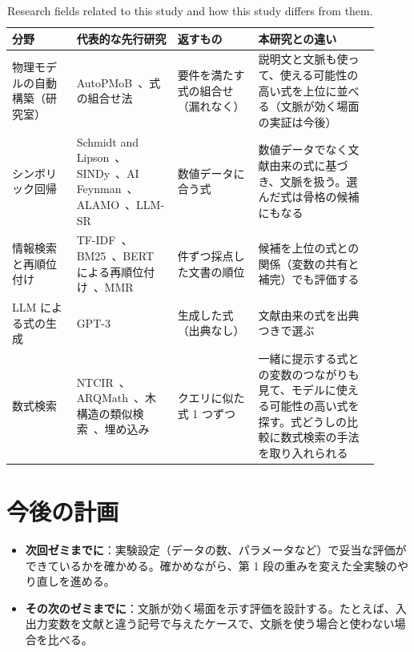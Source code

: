 \documentclass[a4j,dvipdfmx,10pt]{jresume}
\begin{document}
\begin{table}[t]\centering
\footnotesize
\caption{Research fields related to this study and how this study differs from them.}
\label{tab:summary}
\begin{tabular}{@{}>{\raggedright\arraybackslash}p{0.16\linewidth}>{\raggedright\arraybackslash}p{0.25\linewidth}>{\raggedright\arraybackslash}p{0.20\linewidth}>{\raggedright\arraybackslash}p{0.30\linewidth}@{}}
\toprule
分野 & 代表的な先行研究 & 返すもの & 本研究との違い \\
\midrule
物理モデルの自動構築（研究室） & AutoPMoB~\citep{KatoCSTR,KatoProto}、式の組合せ法~\citep{KatoESCAPE,CombineEq} & 要件を満たす式の組合せ（漏れなく） & 説明文と文脈も使って、使える可能性の高い式を上位に並べる（文脈が効く場面の実証は今後） \\
\addlinespace
シンボリック回帰 & Schmidt and Lipson~\citep{SchmidtLipson}、SINDy~\citep{SINDy}、AI Feynman~\citep{AIFeynman}、ALAMO~\citep{ALAMO}、LLM-SR~\citep{LLMSR} & 数値データに合う式 & 数値データでなく文献由来の式に基づき、文脈を扱う。選んだ式は骨格の候補にもなる \\
\addlinespace
情報検索と再順位付け & TF-IDF~\citep{Salton}、BM25~\citep{BM25}、BERT による再順位付け~\citep{BERTrerank}、MMR~\citep{MMR} & 1 件ずつ採点した文書の順位 & 候補を上位の式との関係（変数の共有と補完）でも評価する \\
\addlinespace
LLM による式の生成 & GPT-3~\citep{GPT3} & 生成した式（出典なし） & 文献由来の式を出典つきで選ぶ \\
\addlinespace
数式検索 & NTCIR~\citep{NTCIR12}、ARQMath~\citep{ARQMath}、木構造の類似検索~\citep{Approach0}、埋め込み~\citep{TangentCFT} & クエリに似た式 1 つずつ & 一緒に提示する式との変数のつながりも見て、モデルに使える可能性の高い式を探す。式どうしの比較に数式検索の手法を取り入れられる \\
\bottomrule
\end{tabular}
\end{table}


\section{今後の計画}\label{sec:plan}
\begin{itemize}[leftmargin=1.5em]
  \item \textbf{次回ゼミまでに}：実験設定（データの数、パラメータなど）で妥当な評価ができているかを確かめる。確かめながら、第 1 段の重みを変えた全実験のやり直しを進める。
  \item \textbf{その次のゼミまでに}：文脈が効く場面を示す評価を設計する。たとえば、入出力変数を文献と違う記号で与えたケースで、文脈を使う場合と使わない場合を比べる。
\end{itemize}





\end{document}
